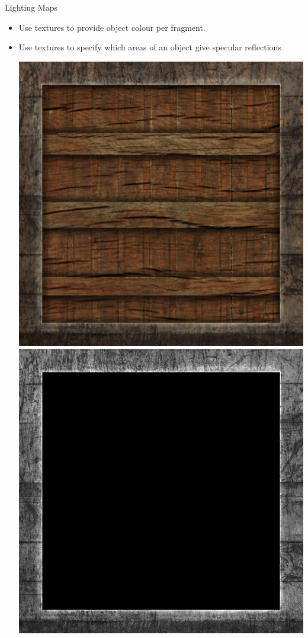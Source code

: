\documentclass{beamer}
\begin{document}
\begin{frame}[fragile]{Lighting Maps}
    \begin{itemize}
        \item Use textures to provide object colour per fragment.
        \item Use textures to specify which areas of an object give specular reflections
        \begin{center}
            \includegraphics[height=0.30\textheight]{images/container_diffuse.png}
            \includegraphics[height=0.30\textheight]{images/container_specular.png}

\end{center}
\end{itemize}
\end{frame}
\end{document}

